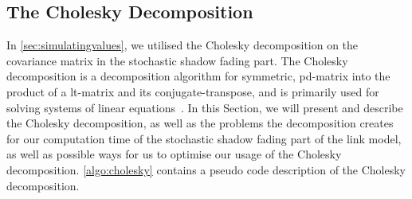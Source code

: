 \subsection{The Cholesky Decomposition}\label{sec:cholesky}
In \autoref{sec:simulatingvalues}, we utilised the Cholesky decomposition on the covariance matrix in the stochastic shadow fading part. The Cholesky decomposition is a decomposition algorithm for \gls{symmetric}, \gls{pd-matrix} into the product of a \gls{lt-matrix} and its \gls{conjugate-transpose}, and is primarily used for solving systems of linear equations~\cite{Press:2007:NRE:1403886}. In this Section, we will present and describe the Cholesky decomposition, as well as the problems the decomposition creates for our computation time of the stochastic shadow fading part of the link model, as well as possible ways for us to optimise our usage of the Cholesky decomposition. \autoref{algo:cholesky} contains a pseudo code description of the Cholesky decomposition. \medbreak

